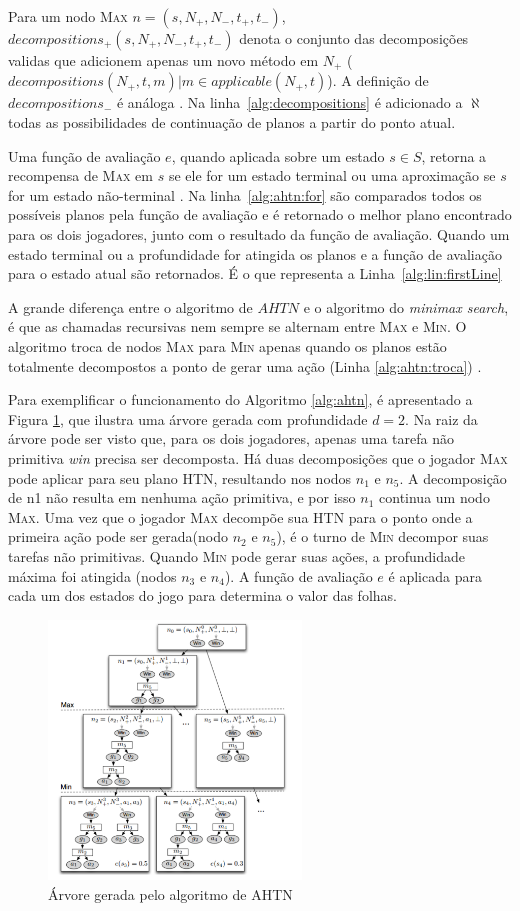 Para um nodo \textsc{Max} $n = (s, N_{+}, N_{-}, t_{+}, t_{-})$, $decompositions_{+}(s, N_{+}, N_{-}, t_{+}, t_{-})$ denota o conjunto das decomposições validas que adicionem apenas um novo método em $N_{+}$ (${decompositions(N_{+}, t, m) | m \in applicable(N_{+}, t)}$).
A definição de $decompositions_{-}$ é análoga \cite{ontanon2015adversarial}.
Na linha~\ref{alg:decompositions} é adicionado a $\aleph$ todas as possibilidades de continuação de planos a partir do ponto atual.

Uma função de avaliação $e$, quando aplicada sobre um estado $s \in S$, retorna a recompensa de \textsc{Max} em $s$ se ele for um estado terminal ou uma aproximação se $s$ for um estado não-terminal \cite{ontanon2015adversarial}. 
Na linha~\ref{alg:ahtn:for} são comparados todos os possíveis planos pela função de avaliação e é retornado o melhor plano encontrado para os dois jogadores, junto com o resultado da função de avaliação. 
Quando um estado terminal ou a profundidade for atingida os planos e a função de avaliação para o estado atual são retornados. É o que representa a Linha~\ref{alg:lin:firstLine}

A grande diferença entre o algoritmo de $AHTN$ e o algoritmo do \textit{minimax search}, é que as chamadas recursivas nem sempre se alternam entre \textsc{Max} e \textsc{Min}. 
O algoritmo troca de nodos \textsc{Max} para \textsc{Min} apenas quando os planos estão totalmente decompostos a ponto de gerar uma ação (Linha \ref{alg:ahtn:troca}) \cite{ontanon2015adversarial}.

Para exemplificar o funcionamento do Algoritmo \ref{alg:ahtn}, é apresentado a Figura \ref{fig:ahtn}, que ilustra uma árvore gerada com profundidade $d = 2$. 
Na raiz da árvore pode ser visto que, para os dois jogadores, apenas uma tarefa não primitiva \textit{win} precisa ser decomposta. 
Há duas decomposições que o jogador \textsc{Max} pode aplicar para seu plano HTN, resultando nos nodos $n_{1}$ e $n_{5}$. 
A decomposição de n1 não resulta em nenhuma ação primitiva, e por isso $n_{1}$ continua um nodo \textsc{Max}. 
Uma vez que o jogador \textsc{Max} decompõe sua HTN para o ponto onde a primeira ação pode ser gerada(nodo $n_{2}$ e $n_{5}$), é o turno de \textsc{Min} decompor suas tarefas não primitivas. Quando \textsc{Min} pode gerar suas ações, a profundidade máxima foi atingida (nodos $n_{3}$ e $n_{4}$). 
A função de avaliação $e$ é aplicada para cada um dos estados do jogo para determina o valor das folhas.

\begin{figure}[ht]
	\centering
	\includegraphics[width=0.6\textwidth]{fig/ahtn.pdf}
	\caption{Árvore gerada pelo algoritmo de AHTN}
	\label{fig:ahtn}
\end{figure}


